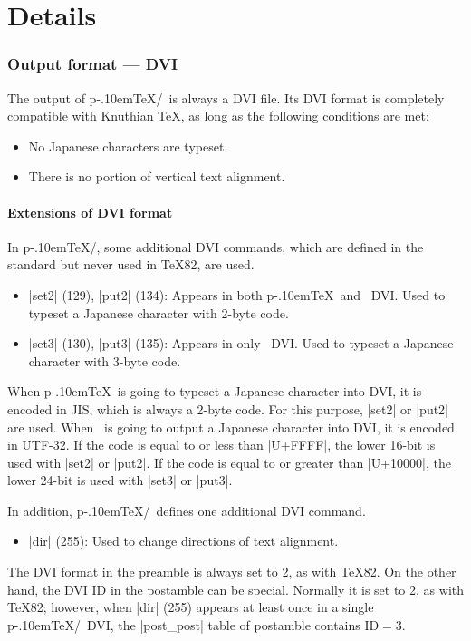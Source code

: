 \documentclass[a4paper,11pt]{article}
\def\pTeX{p\kern-.10em\TeX}
\begin{document}
\newpage


\part{Details}%

\section{Output format --- DVI}

The output of \pTeX/\upTeX\ is always a DVI file.
Its DVI format is completely compatible with Knuthian \TeX,
as long as the following conditions are met:
\begin{itemize}
  \item No Japanese characters are typeset.
  \item There is no portion of vertical text alignment.
\end{itemize}

\subsection{Extensions of DVI format}

In \pTeX/\upTeX,
some additional DVI commands, which are defined in the
standard \cite{dvistd0} but never used in \TeX82, are used.
\begin{itemize}
  \item |set2| (129), |put2| (134):
    Appears in both \pTeX\ and \upTeX\ DVI.
    Used to typeset a Japanese character with 2-byte code.
  \item |set3| (130), |put3| (135):
    Appears in only \upTeX\ DVI.
    Used to typeset a Japanese character with 3-byte code.
\end{itemize}
When \pTeX\ is going to typeset a Japanese character into DVI,
it is encoded in JIS, which is always a 2-byte code.
For this purpose, |set2| or |put2| are used.
When \upTeX\ is going to output a Japanese character into DVI,
it is encoded in UTF-32.
If the code is equal to or less than |U+FFFF|,
the lower 16-bit is used with |set2| or |put2|.
If the code is equal to or greater than |U+10000|,
the lower 24-bit is used with |set3| or |put3|.

In addition, \pTeX/\upTeX\ defines one additional DVI command.
\begin{itemize}
  \item |dir| (255):
    Used to change directions of text alignment.
\end{itemize}
The DVI format in the preamble is always set to 2, as with \TeX82.
On the other hand, the DVI ID in the postamble can be special.
Normally it is set to 2, as with \TeX82; however,
when |dir| (255) appears at least once in a single \pTeX/\upTeX\ DVI,
the |post_post| table of postamble contains $\mathrm{ID} = 3$.
\end{document}
